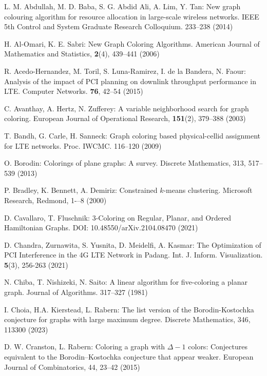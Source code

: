 \documentclass[runningheads]{llncs}
\begin{document}
\begin{thebibliography}{8}
 L. M. Abdullah, M. D. Baba, S. G. Abdid Ali, A. Lim, Y. Tan: New graph colouring algorithm for resource allocation in large-scale wireless networks. IEEE 5th Control and System Graduate Research Colloquium. 233--238 (2014)

 H. Al-Omari, K. E. Sabri: New Graph Coloring Algorithms. American Journal of Mathematics and Statistics, \textbf{2}(4), 439--441 (2006)

 R. Acedo-Hernandez, M. Toril, S. Luna-Ramirez, I. de la Bandera, N. Faour: Analysis of the impact of PCI planning on downlink throughput performance in LTE. Computer Networks. \textbf{76}, 42--54 (2015)

 C. Avanthay, A. Hertz, N. Zufferey: A variable neighborhood search for graph coloring. European Journal of Operational Research, \textbf{151}(2), 379--388 (2003)

 T. Bandh, G. Carle, H. Sanneck: Graph coloring based physical-cellid assignment for LTE networks. Proc. IWCMC. 116--120 (2009)

 O. Borodin: Colorings of plane graphs: A survey. Discrete Mathematics, 313, 517--539 (2013)

 P. Bradley, K. Bennett, A. Demiriz: Constrained $k$-means clustering. Microsoft
Research, Redmond, 1-–8 (2000)

 D. Cavallaro, T. Fluschnik: 3-Coloring on Regular, Planar, and Ordered Hamiltonian Graphs. DOI: 10.48550/arXiv.2104.08470 (2021)

 D. Chandra, Zurnawita, S. Yusnita, D. Meidelfi, A. Kasmar: The Optimization of PCI Interference in the 4G LTE Network in Padang. Int. J. Inform. Visualization. \textbf{5}(3), 256-263 (2021)

 N. Chiba, T. Nishizeki, N. Saito: A linear algorithm for five-coloring a planar graph. Journal of Algorithms. 317--327 (1981)

 I. Choia, H.A. Kierstead, L. Rabern: The list version of the Borodin-Kostochka conjecture for graphs with large maximum degree. Discrete Mathematics, 346, 113300 (2023)

 D. W. Cranston, L. Rabern: Coloring a graph with $\Delta-1$ colors: Conjectures equivalent to the Borodin–Kostochka conjecture that appear weaker. European Journal of Combinatorics, 44, 23--42 (2015)


\end{thebibliography}
\end{document}
